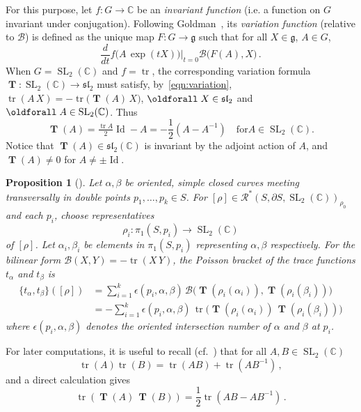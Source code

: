 \documentclass[11pt]{article}
\newtheorem{prop}[theo]{Proposition}
\theoremstyle{definition}
\numberwithin{equation}{section}
\numberwithin{figure}{section}
\numberwithin{table}{section}
\DeclareMathOperator{\SL}{SL}
\DeclareMathOperator{\Id}{Id}
\DeclareMathOperator{\tr}{tr}
\newcommand{\Bcal}{\mathcal{B}}
\newcommand{\Rcal}{\mathcal{R}}
\newcommand{\Cbb}{\mathbb{C}}
\newcommand{\gfrk}{\mathfrak{g}}
\newcommand{\slfrk}{\mathfrak{sl}}
\newcommand{\Tbf}{\mathbf{T}}
\renewcommand*{\forall}{\mathrel{\oldforall}}
\begin{document}
For this purpose, let $f\colon G\to\Cbb$ be an \emph{invariant function} (i.e. a function on $G$ invariant under conjugation). Following Goldman~\cite{GoldmanComplex}, its \emph{variation function} (relative to $\Bcal$) is defined as the unique map $F\colon G\to\gfrk$ such that for all $X\in\gfrk$, $A\in G$,
\begin{equation}\label{eqn:variation}
\frac{d}{dt} f\big(A \, \exp(tX)\big) \big|_{t=0} \Bcal\big(F(A),X\big)\,.
\end{equation}
When $G=\SL_2(\Cbb)$ and $f=\tr$, the corresponding variation formula $\operatorname{\Tbf}\colon\SL_2(\Cbb)\to\slfrk_2$ must satisfy, by~\eqref{eqn:variation}, $\tr(A \, X) = - \tr\big(\operatorname{\Tbf}(A)\,X\big)$, $\forall X\in\slfrk_2$ and $ \forall A\in\SL_2(\Cbb)$. Thus
\[
\operatorname{\Tbf}(A)=\tfrac{\tr A}{2} \Id -A =-\frac{1}{2}(A-A^{-1}) \quad \text{for}A \in \SL_2(\Cbb).
\]
Notice that $\operatorname{\Tbf} (A)\in \slfrk_2 (\Cbb)$ is invariant by the adjoint action of $A$, and $\operatorname{\Tbf}(A)\neq 0$ for $A\neq\pm\Id$.

\begin{prop}[\cite{GoldmanComplex,LawtonP}]\label{Prop:GoldmanPoisson}
Let $\alpha,\beta$ be oriented, simple closed curves meeting transversally in double points $p_1,\dots,p_k\in S$. For $[\rho]\in\Rcal^*(S,\partial S, \SL_2(\Cbb))_{\rho_0}$ and each $p_i$, choose representatives
\[
\rho_i\colon\pi_1(S,p_i)\to \SL_2(\Cbb)
\]
of $[\rho]$. Let $\alpha_i,\beta_i$ be elements in $\pi_1(S,p_i)$ representing $\alpha,\beta$ respectively. For the bilinear form $\Bcal(X,Y)= -\tr (X\, Y)$, the Poisson bracket of the trace functions $t_\alpha$ and $t_\beta$ is
\begin{align*}
\{t_\alpha, t_\beta \}([\rho]) &=
\sum_{i=1}^k \epsilon(p_i,\alpha,\beta)\,
\Bcal\big(\operatorname{\Tbf}(\rho_i(\alpha_i)), \operatorname{\Tbf}(\rho_i(\beta_i))\big) \\
&=-
\sum_{i=1}^k \epsilon(p_i,\alpha,\beta)\,
\tr
\big(\operatorname{\Tbf}(\rho_i(\alpha_i))\,\operatorname{\Tbf}(\rho_i(\beta_i))\big)
\end{align*}
where $\epsilon(p_i,\alpha,\beta)$ denotes the oriented intersection number of $\alpha$ and $\beta$ at $p_i$.
\end{prop}


For later computations, it is useful to recall (cf.~\cite{AcunaMontesinos}) that for all $A,B\in \SL_2(\Cbb)$
\begin{equation}\label{eqn:trace}
\tr(A) \tr(B)=\tr(A B) +\tr(A B^{-1})\,,
\end{equation}
and a direct calculation gives
\begin{equation}\label{eqn:traceInvariant}
\tr(\operatorname{\Tbf}(A)\, \operatorname{\Tbf}(B))=
\frac{1}{2} \tr(AB-AB^{-1})\,.
\end{equation}
\end{document}
